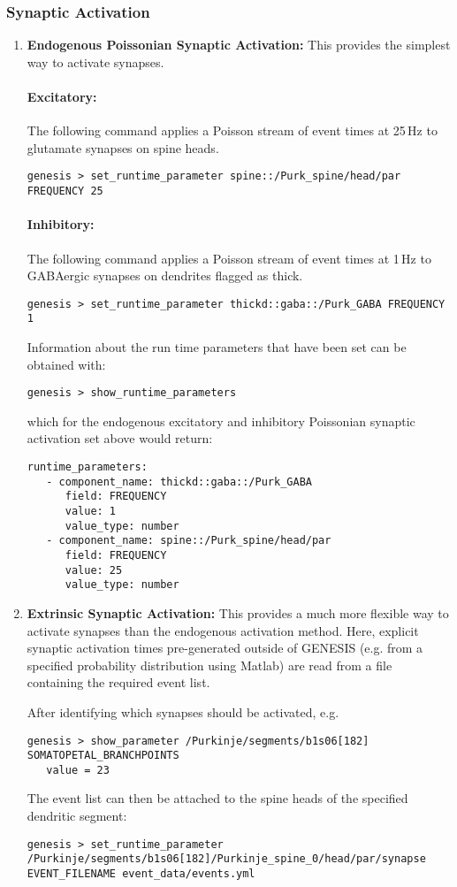 \documentclass[12pt]{article}
\begin{document}
\subsubsection*{Synaptic Activation}
\begin{enumerate}
   \item{\bf Endogenous Poissonian Synaptic Activation:} This provides the simplest way to activate synapses.
   \paragraph{Excitatory:} The following command applies a Poisson stream of event times at 25\,Hz to glutamate synapses on spine heads.
\begin{verbatim}
genesis > set_runtime_parameter spine::/Purk_spine/head/par FREQUENCY 25
\end{verbatim}
   \paragraph{Inhibitory:} The following command applies a Poisson stream of event times at 1\,Hz to GABAergic synapses on dendrites flagged as thick.
\begin{verbatim}
genesis > set_runtime_parameter thickd::gaba::/Purk_GABA FREQUENCY 1
\end{verbatim}
Information about the run time parameters that have been set can be obtained with:
\begin{verbatim}
genesis > show_runtime_parameters
\end{verbatim}
which for the endogenous excitatory and inhibitory Poissonian synaptic activation set above would return:
\begin{verbatim} 
runtime_parameters:
   - component_name: thickd::gaba::/Purk_GABA
      field: FREQUENCY
      value: 1
      value_type: number
   - component_name: spine::/Purk_spine/head/par
      field: FREQUENCY
      value: 25
      value_type: number
 \end{verbatim}
    
   \item{\bf Extrinsic Synaptic Activation:} This provides a much more flexible way to activate synapses than the endogenous activation method. Here, explicit synaptic activation times pre-generated outside of GENESIS (e.g. from a specified probability distribution using Matlab) are read from a file containing the required event list.
   
   After identifying which synapses should be activated, e.g.
   \begin{verbatim}
genesis > show_parameter /Purkinje/segments/b1s06[182] SOMATOPETAL_BRANCHPOINTS
   value = 23 
   \end{verbatim}
   The event list can then be attached to the spine heads of the specified dendritic segment:
   \begin{verbatim}
genesis > set_runtime_parameter /Purkinje/segments/b1s06[182]/Purkinje_spine_0/head/par/synapse EVENT_FILENAME event_data/events.yml
   \end{verbatim}   
\end{enumerate}
\end{document}
